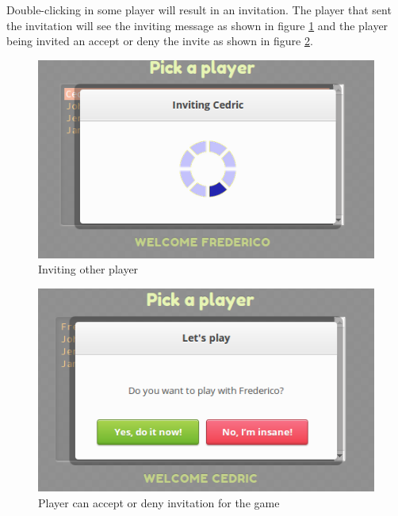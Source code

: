 \documentclass{chi-ext}
\begin{document}
Double-clicking in some player will result in an invitation. The player that sent the invitation will see the inviting message as shown in figure \ref{fig:inviting} and the player being invited an accept or deny the invite as shown in figure \ref{fig:inviting2}.

\begin{figure}
\hspace*{-0.4\columnwidth}%
\parbox{1.4\columnwidth}{
  \centering
  \includegraphics[width=1.0\columnwidth]{inviting.png}
  \caption{Inviting other player}
  \label{fig:inviting}
}
\end{figure}

\begin{figure}
\hspace*{-0.4\columnwidth}%
\parbox{1.4\columnwidth}{
  \centering
  \includegraphics[width=1.0\columnwidth]{inviting2.png}
  \caption{Player can accept or deny invitation for the game}
  \label{fig:inviting2}
}
\end{figure}
\end{document}
